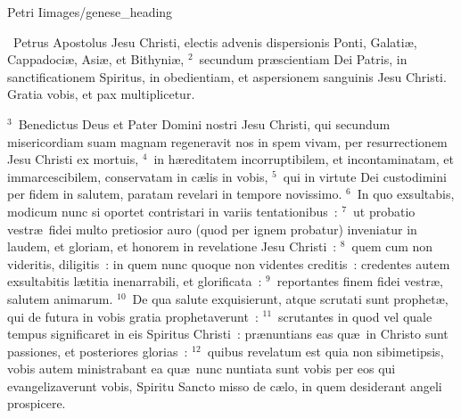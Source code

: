 {Petri I}{images/genese_heading}

~\lettrine[lines=10,image=true,loversize=0.05,lraise=-0.03]{P}{}etrus Apostolus Jesu Christi, electis advenis dispersionis Ponti, Galati\ae , Cappadoci\ae , Asi\ae , et Bithyni\ae ,
${}^{2}$~secundum pr\ae scientiam Dei Patris, in sanctificationem Spiritus, in obedientiam, et aspersionem sanguinis Jesu Christi. Gratia vobis, et pax multiplicetur.


${}^{3}$~Benedictus Deus et Pater Domini nostri Jesu Christi, qui secundum misericordiam suam magnam regeneravit nos in spem vivam, per resurrectionem Jesu Christi ex mortuis,
${}^{4}$~in h\ae reditatem incorruptibilem, et incontaminatam, et immarcescibilem, conservatam in c\ae lis in vobis,
${}^{5}$~qui in virtute Dei custodimini per fidem in salutem, paratam revelari in tempore novissimo.
${}^{6}$~In quo exsultabis, modicum nunc si oportet contristari in variis tentationibus~:
${}^{7}$~ut probatio vestr\ae\ fidei multo pretiosior auro (quod per ignem probatur) inveniatur in laudem, et gloriam, et honorem in revelatione Jesu Christi~:
${}^{8}$~quem cum non videritis, diligitis~: in quem nunc quoque non videntes creditis~: credentes autem exsultabitis l\ae titia inenarrabili, et glorificata~:
${}^{9}$~reportantes finem fidei vestr\ae , salutem animarum.
${}^{10}$~De qua salute exquisierunt, atque scrutati sunt prophet\ae , qui de futura in vobis gratia prophetaverunt~:
${}^{11}$~scrutantes in quod vel quale tempus significaret in eis Spiritus Christi~: pr\ae nuntians eas qu\ae\ in Christo sunt passiones, et posteriores glorias~:
${}^{12}$~quibus revelatum est quia non sibimetipsis, vobis autem ministrabant ea qu\ae\ nunc nuntiata sunt vobis per eos qui evangelizaverunt vobis, Spiritu Sancto misso de c\ae lo, in quem desiderant angeli prospicere.


